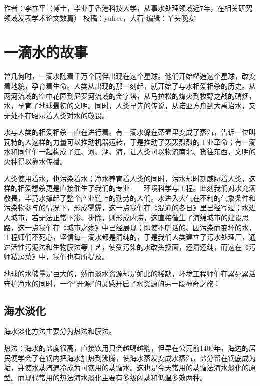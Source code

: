 \documentclass[]{book}
\begin{document}
作者：李立平（博士，毕业于香港科技大学，从事水处理领域近7年，在相关研究领域发表学术论文数篇）
校稿：yufree，大石
编辑：丫头晚安

\hypertarget{ux4e00ux6ef4ux6c34ux7684ux6545ux4e8b}{%
\section{一滴水的故事}\label{ux4e00ux6ef4ux6c34ux7684ux6545ux4e8b}}

曾几何时，一滴水随着千万个同伴出现在这个星球。他们开始塑造这个星球，改变着地貌，孕育着生命。人类从出现的那一刻起，就开始了与水相爱相杀的历史。从两河流域的空中花园到尼罗河流域的金字塔，从马拉松的烽火到牧野之战的硝烟，水，孕育了地球最初的文明。同时，人类早先的传说，从诺亚方舟到大禹治水，又无处不在昭示着人类对水的敬畏。

水与人类的相爱相杀一直在进行着。有一滴水躲在茶壶里变成了蒸汽，告诉一位叫瓦特的人这样的力量可以推动机器运转，于是推动了轰轰烈烈的工业革命；有一滴水和同伴们一起构成了江、河、湖、海，让人类可以物流南北、货往东西，文明的火种得以靠水传播。

人类使用着水，也污染着水；净水养育着人类的同时，污水却时刻威胁着人类，这样的相爱想杀更是直接催生了我们的专业------环境科学与工程。此刻我们对水充满敬畏，毕竟水撑起了整个产业链上的勤劳的人们。水进入大气在不利的气象条件和污染物参与的情况下，形成雾霾，这一点我们在《混沌的冬日》里已经写过；水进入城市，若无法正常下渗、排除，则形成内涝，这直接催生了海绵城市的建设思路，这一点我们在《城市之殇》中已经展现；即使不听话的、因污染而变坏的水，工程师们不死心，坚信每一滴水都是清纯的，于是我们人类建立了污水处理厂，通过活性污泥法和生物膜法等工艺，使受污染的水改头换面，还清还纯，而这在《污师私房菜》中，我们也有所提及。

地球的水储量是巨大的，然而淡水资源却是如此的稀缺，环境工程师们在累死累活守护净水的同时，一个``开源''的灵感开启了水资源的另一段神奇之旅：

\hypertarget{ux6d77ux6c34ux6de1ux5316}{%
\subsection{海水淡化}\label{ux6d77ux6c34ux6de1ux5316}}

海水淡化方法主要分为热法和膜法。

热法：海水的盐度很高，直接饮用只会越喝越齁，但早在公元前1400年，海边的居民便学会了在锅内把海水加热到沸腾，使海水蒸发变成水蒸汽，盐分留在锅底成为垢，并使水蒸汽遇冷成为可饮用的蒸馏水。这也是今天常用的蒸馏法海水淡化的原型。而现代常用的热法海水淡化主要有多级闪蒸和低温多效两种。
\end{document}
